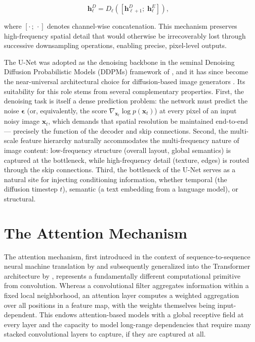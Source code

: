 \begin{equation}
    \mathbf{h}^{D}_{\ell} = D_\ell\!\left(\left[\mathbf{h}^{D}_{\ell+1};\; \mathbf{h}^{E}_\ell\right]\right),
    \label{eq:unet_skip}
\end{equation}

where $[\cdot\,;\,\cdot]$ denotes channel-wise concatenation. This mechanism preserves high-frequency spatial detail that would otherwise be irrecoverably lost through successive downsampling operations, enabling precise, pixel-level outputs.

The U-Net was adopted as the denoising backbone in the seminal Denoising Diffusion Probabilistic Models (DDPMs) framework of \cite{ho2020denoising}, and it has since become the near-universal architectural choice for diffusion-based image generators \cite{nichol2021improved, dhariwal2021diffusion, rombach2022latent}. Its suitability for this role stems from several complementary properties. First, the denoising task is itself a dense prediction problem: the network must predict the noise $\boldsymbol{\epsilon}$ (or, equivalently, the score $\nabla_{\mathbf{x}_t} \log p(\mathbf{x}_t)$) at every pixel of an input noisy image $\mathbf{x}_t$, which demands that spatial resolution be maintained end-to-end — precisely the function of the decoder and skip connections. Second, the multi-scale feature hierarchy naturally accommodates the multi-frequency nature of image content: low-frequency structure (overall layout, global semantics) is captured at the bottleneck, while high-frequency detail (texture, edges) is routed through the skip connections. Third, the bottleneck of the U-Net serves as a natural site for injecting conditioning information, whether temporal (the diffusion timestep $t$), semantic (a text embedding from a language model), or structural.

\section{The Attention Mechanism}
\label{sec:attention}

The attention mechanism, first introduced in the context of sequence-to-sequence neural machine translation by and subsequently generalized into the Transformer architecture by \cite{vaswani2017attention}, represents a fundamentally different computational primitive from convolution. Whereas a convolutional filter aggregates information within a fixed local neighborhood, an attention layer computes a weighted aggregation over all positions in a feature map, with the weights themselves being input-dependent. This endows attention-based models with a global receptive field at every layer and the capacity to model long-range dependencies that require many stacked convolutional layers to capture, if they are captured at all.

